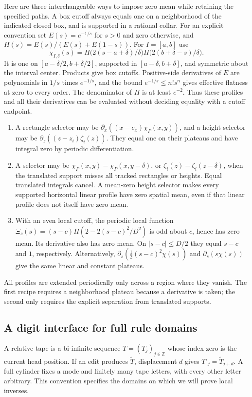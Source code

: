 Here are three interchangeable ways to impose zero mean while retaining
the specified paths.  A box cutoff always equals one on a neighborhood of
the indicated closed box, and is supported in a rational collar.  For an
explicit convention set $E(s)=e^{-1/s}$ for $s>0$ and zero otherwise,
and $H(s)=E(s)/(E(s)+E(1-s))$.  For $I=[a,b]$ use
\[
 \chi_{I,\delta}(s)=
 H\bigl(2(s-a+\delta)/\delta\bigr)
 H\bigl(2(b+\delta-s)/\delta\bigr).
\]
It is one on $[a-\delta/2,b+\delta/2]$, supported in
$[a-\delta,b+\delta]$, and symmetric about the interval center.
Products give box cutoffs.  Positive-side derivatives of $E$ are
polynomials in $1/s$ times $e^{-1/s}$, and the bound
$e^{-1/s}\le n!s^n$ gives effective flatness at zero to every order.
The denominator of $H$ is at least $e^{-2}$.  Thus these profiles
and all their derivatives can be evaluated without deciding equality
with a cutoff endpoint.
\begin{enumerate}
\item A rectangle selector may be
$\partial_x((x-c_x)\chi_P(x,y))$, and a height selector may be
$\partial_z((z-z_i)\zeta_i(z))$.  They equal one on their
plateaus and have integral zero by periodic differentiation.
\item A selector may be $\chi_P(x,y)-\chi_P(x,y-\delta)$,
or $\zeta_i(z)-\zeta_i(z-\delta)$, when the translated support
misses all tracked rectangles or heights.  Equal translated integrals
cancel.  A mean-zero height selector makes every supported horizontal
linear profile have zero spatial mean, even if that linear profile
does not itself have zero mean.
\item With an even local cutoff, the periodic local function
$\Xi_c(s)=(s-c)H(2-2(s-c)^2/D^2)$ is odd about $c$, hence has
zero mean.  Its derivative also has zero mean.  On $|s-c|\le D/2$
they equal $s-c$ and $1$, respectively.  Alternatively,
$\partial_s(\tfrac12(s-c)^2\chi(s))$ and
$\partial_s(s\chi(s))$ give the same linear and constant plateaus.
\end{enumerate}
All profiles are extended periodically only across a region where they
vanish.  The first recipe requires a neighborhood plateau because a
derivative is taken; the second only requires the explicit separation
from translated supports.



\subsection{A digit interface for full rule domains}
\label{sv:digits}
A relative tape is a bi-infinite sequence $T=(T_j)_{j\in\mathbb Z}$
whose index zero is the current head position. If an edit produces
$\widetilde T$, displacement $d$ gives $T'_j=\widetilde T_{j+d}$.
A full cylinder fixes a mode and finitely many tape letters, with every
other letter arbitrary. This convention specifies the domains on which
we will prove local inverses.

